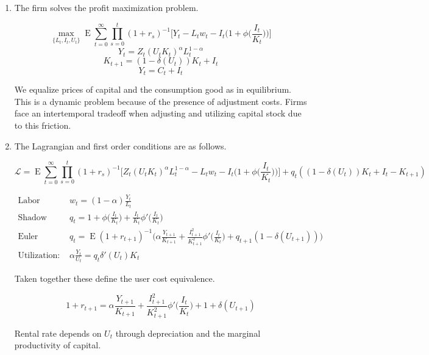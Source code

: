 \documentclass[11pt]{article}
\DeclareMathOperator{\ev}{E}
\begin{document}
    \begin{enumerate}

        \item The firm solves the profit maximization problem.

            $$ \max_{\{L_t, I_t, U_t\}} \ev \sum_{t=0}^\infty \prod_{s=0}^t (1+r_s)^{-1} \bigg [ Y_t - L_t w_t - I_t \bigg (1 + \phi \bigg ( \frac{I_t}{K_t} \bigg ) \bigg ) \bigg ] $$
            $$ Y_t = Z_t (U_t K_t)^\alpha L_t^{1-\alpha} $$
            $$ K_{t+1} = (1-\delta(U_t))K_t + I_t $$
            $$ Y_t = C_t + I_t $$

        We equalize prices of capital and the consumption good as in equilibrium. This is a dynamic problem because of the presence of adjustment costs. Firms face an intertemporal tradeoff when adjusting and utilizing capital stock due to this friction.

        \item The Lagrangian and first order conditions are as follows.

            $$ \mathcal L = \ev \sum_{t=0}^\infty \prod_{s=0}^t (1+r_s)^{-1} \bigg [ Z_t (U_t K_t)^\alpha L_t^{1-\alpha} - L_t w_t - I_t \bigg (1 + \phi \bigg ( \frac{I_t}{K_t} \bigg ) \bigg ) \bigg ] + q_t ((1-\delta(U_t))K_t + I_t - K_{t+1}) $$

            \begin{align*}
                \text{Labor demand:~} & w_t = (1-\alpha) \frac{Y_t}{L_t} \\
                \text{Shadow value of capital:~} & q_t = 1 + \phi \bigg ( \frac{I_t}{K_t} \bigg ) + \frac{I_t}{K_t} \phi' \bigg ( \frac{I_t}{K_t} \bigg ) \\
                \text{Euler equation:~} & q_t = \ev (1+r_{t+1})^{-1} \bigg ( \alpha \frac{Y_{t+1}}{K_{t+1}} + \frac{I_{t+1}^2}{K_{t+1}^2} \phi' \bigg ( \frac{I_t}{K_t} \bigg ) + q_{t+1} (1-\delta(U_{t+1})) \bigg ) \\
                \text{Utilization:~} & \alpha \frac{Y_t}{U_t} = q_t \delta'(U_t) K_t
            \end{align*}

        Taken together these define the user cost equivalence.

            $$ 1 + r_{t+1} = \alpha \frac{Y_{t+1}}{K_{t+1}} + \frac{I_{t+1}^2}{K_{t+1}^2} \phi' \bigg ( \frac{I_t}{K_t} \bigg ) + 1 + \delta(U_{t+1}) $$

        Rental rate depends on $U_t$ through depreciation and the marginal productivity of capital.


\end{enumerate}
\end{document}
